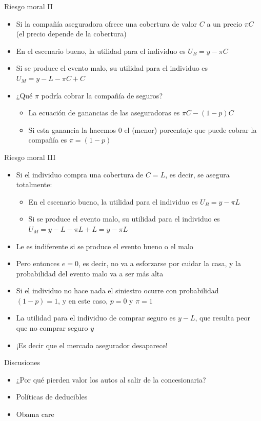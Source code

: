 \documentclass{beamer}
\begin{document}
\begin{frame}{Riesgo moral II}
    \begin{itemize}
    \item Si la compañía aseguradora ofrece una cobertura de valor $C$ a un precio $\pi C$ (el precio depende de la cobertura) \vspace{2mm}
    \item En el escenario bueno, la utilidad para el individuo es 
    $U_B = y - \pi C$
    \item Si se produce el evento malo, su utilidad para el individuo es 
    $U_M = y - L - \pi C + C$ \vspace{2mm}
    \item ¿Qué $\pi$ podría cobrar la compañía de seguros?
    \begin{itemize}
    \item La ecuación de ganancias de las aseguradoras es  
    $\pi C - (1-p) C$
    \item Si esta ganancia la hacemos $0$ el (menor) porcentaje que puede cobrar la compañía es $\pi=(1-p)$
    \end{itemize}
    \end{itemize}
\end{frame}

\begin{frame}{Riesgo moral III}
    \begin{itemize}
    \item Si el individuo compra una cobertura de $C=L$, es decir, se asegura totalmente:
    \begin{itemize}
    \item En el escenario bueno, la utilidad para el individuo es 
    $U_B = y - \pi L$
    \item Si se produce el evento malo, su utilidad para el individuo es 
    $U_M = y - L - \pi L + L = y - \pi L$ 
    \end{itemize}
    \item Le es indiferente si se produce el evento bueno o el malo 
    \item Pero entonces $e=0$, es decir, no va a esforzarse por cuidar la casa, y la probabilidad del evento malo va a ser más alta \vspace{2mm}
    \item Si el individuo no hace nada el siniestro ocurre con probabilidad $(1-p)=1$, y en este caso, $p=0$ y $\pi=1$
    \item La utilidad para el individuo de comprar seguro es $y-L$, que resulta peor que no comprar seguro $y$
    \item ¡Es decir que el mercado asegurador desaparece! 
  \end{itemize}   
\end{frame}


\begin{frame}{Discusiones}
    \begin{itemize}
        \item ¿Por qué pierden valor los autos al salir de la concesionaria? \vspace{1mm}
        \item Políticas de deducibles \vspace{1mm}
        \item Obama care
    \end{itemize}
\end{frame}
\end{document}
